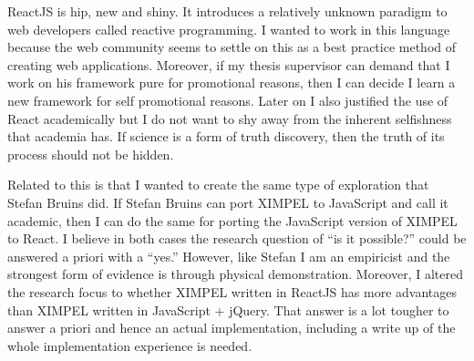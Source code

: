 ReactJS is hip, new and shiny. It introduces a relatively unknown paradigm to web developers called reactive programming. I wanted to work in this language because the web community seems to settle on this as a best practice method of creating web applications. Moreover, if my thesis supervisor can demand that I work on his framework pure for promotional reasons, then I can decide I learn a new framework for self promotional reasons. Later on I also justified the use of React academically but I do not want to shy away from the inherent selfishness that academia has. If science is a form of truth discovery, then the truth of its process should not be hidden.

Related to this is that I wanted to create the same type of exploration that Stefan Bruins did. If Stefan Bruins can port XIMPEL to JavaScript and call it academic, then I can do the same for porting the JavaScript version of XIMPEL to React. I believe in both cases the research question of ``is it possible?'' could be answered a priori with a ``yes.'' However, like Stefan I am an empiricist and the strongest form of evidence is through physical demonstration. Moreover, I altered the research focus to whether XIMPEL written in ReactJS has more advantages than XIMPEL written in JavaScript + jQuery. That answer is a lot tougher to answer a priori and hence an actual implementation, including a write up of the whole implementation experience is needed.